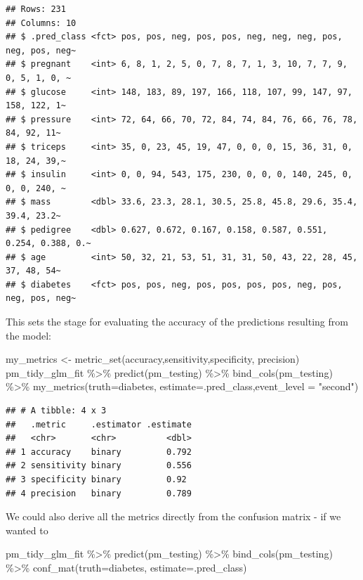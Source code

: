 \documentclass[
]{article}
\newenvironment{Shaded}{\begin{snugshade}}{\end{snugshade}}
\newcommand{\AttributeTok}[1]{\textcolor[rgb]{0.77,0.63,0.00}{#1}}
\newcommand{\FunctionTok}[1]{\textcolor[rgb]{0.00,0.00,0.00}{#1}}
\newcommand{\NormalTok}[1]{#1}
\newcommand{\OtherTok}[1]{\textcolor[rgb]{0.56,0.35,0.01}{#1}}
\newcommand{\SpecialCharTok}[1]{\textcolor[rgb]{0.00,0.00,0.00}{#1}}
\newcommand{\StringTok}[1]{\textcolor[rgb]{0.31,0.60,0.02}{#1}}
\begin{document}
\begin{verbatim}
## Rows: 231
## Columns: 10
## $ .pred_class <fct> pos, pos, neg, pos, pos, neg, neg, neg, pos, neg, pos, neg~
## $ pregnant    <int> 6, 8, 1, 2, 5, 0, 7, 8, 7, 1, 3, 10, 7, 7, 9, 0, 5, 1, 0, ~
## $ glucose     <int> 148, 183, 89, 197, 166, 118, 107, 99, 147, 97, 158, 122, 1~
## $ pressure    <int> 72, 64, 66, 70, 72, 84, 74, 84, 76, 66, 76, 78, 84, 92, 11~
## $ triceps     <int> 35, 0, 23, 45, 19, 47, 0, 0, 0, 15, 36, 31, 0, 18, 24, 39,~
## $ insulin     <int> 0, 0, 94, 543, 175, 230, 0, 0, 0, 140, 245, 0, 0, 0, 240, ~
## $ mass        <dbl> 33.6, 23.3, 28.1, 30.5, 25.8, 45.8, 29.6, 35.4, 39.4, 23.2~
## $ pedigree    <dbl> 0.627, 0.672, 0.167, 0.158, 0.587, 0.551, 0.254, 0.388, 0.~
## $ age         <int> 50, 32, 21, 53, 51, 31, 31, 50, 43, 22, 28, 45, 37, 48, 54~
## $ diabetes    <fct> pos, pos, neg, pos, pos, pos, pos, neg, pos, neg, pos, neg~
\end{verbatim}

This sets the stage for evaluating the accuracy of the predictions
resulting from the model:

\begin{Shaded}
\begin{Highlighting}[]
\NormalTok{my\_metrics }\OtherTok{\textless{}{-}} \FunctionTok{metric\_set}\NormalTok{(accuracy,sensitivity,specificity, precision)}
\NormalTok{pm\_tidy\_glm\_fit }\SpecialCharTok{\%\textgreater{}\%}
  \FunctionTok{predict}\NormalTok{(pm\_testing) }\SpecialCharTok{\%\textgreater{}\%}
  \FunctionTok{bind\_cols}\NormalTok{(pm\_testing) }\SpecialCharTok{\%\textgreater{}\%}
  \FunctionTok{my\_metrics}\NormalTok{(}\AttributeTok{truth=}\NormalTok{diabetes, }\AttributeTok{estimate=}\NormalTok{.pred\_class,}\AttributeTok{event\_level =} \StringTok{"second"}\NormalTok{)}
\end{Highlighting}
\end{Shaded}

\begin{verbatim}
## # A tibble: 4 x 3
##   .metric     .estimator .estimate
##   <chr>       <chr>          <dbl>
## 1 accuracy    binary         0.792
## 2 sensitivity binary         0.556
## 3 specificity binary         0.92 
## 4 precision   binary         0.789
\end{verbatim}

We could also derive all the metrics directly from the confusion matrix
- if we wanted to

\begin{Shaded}
\begin{Highlighting}[]
\NormalTok{pm\_tidy\_glm\_fit }\SpecialCharTok{\%\textgreater{}\%}
  \FunctionTok{predict}\NormalTok{(pm\_testing) }\SpecialCharTok{\%\textgreater{}\%}
  \FunctionTok{bind\_cols}\NormalTok{(pm\_testing) }\SpecialCharTok{\%\textgreater{}\%}
  \FunctionTok{conf\_mat}\NormalTok{(}\AttributeTok{truth=}\NormalTok{diabetes, }\AttributeTok{estimate=}\NormalTok{.pred\_class)}
\end{Highlighting}
\end{Shaded}
\end{document}
